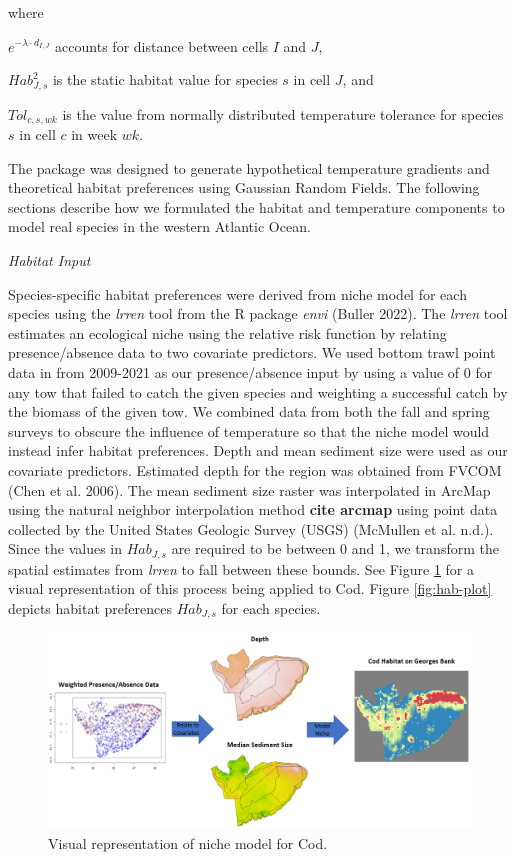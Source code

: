 \documentclass[
  12pt,
]{article}
\begin{document}
where

\(e^{-\lambda \cdot d_{I,J}}\) accounts for distance between cells \(I\) and \(J\),

\(Hab^2_{J,s}\) is the static habitat value for species \(s\) in cell \(J\), and

\(Tol_{c,s,wk}\) is the value from normally distributed temperature tolerance for species \(s\) in cell \(c\) in week \(wk\).

The package was designed to generate hypothetical temperature gradients and theoretical habitat preferences using Gaussian Random Fields. The following sections describe how we formulated the habitat and temperature components to model real species in the western Atlantic Ocean.

\emph{Habitat Input}

Species-specific habitat preferences were derived from niche model for each species using the \emph{lrren} tool from the R package \emph{envi} (Buller 2022). The \emph{lrren} tool estimates an ecological niche using the relative risk function by relating presence/absence data to two covariate predictors. We used bottom trawl point data in from 2009-2021 as our presence/absence input by using a value of 0 for any tow that failed to catch the given species and weighting a successful catch by the biomass of the given tow. We combined data from both the fall and spring surveys to obscure the influence of temperature so that the niche model would instead infer habitat preferences. Depth and mean sediment size were used as our covariate predictors. Estimated depth for the region was obtained from FVCOM (Chen et al. 2006). The mean sediment size raster was interpolated in ArcMap using the natural neighbor interpolation method \textbf{cite arcmap} using point data collected by the United States Geologic Survey (USGS) (McMullen et al. n.d.). Since the values in \(Hab_{J,s}\) are required to be between 0 and 1, we transform the spatial estimates from \emph{lrren} to fall between these bounds. See Figure \ref{fig:hab-plot1} for a visual representation of this process being applied to Cod. Figure \ref{fig:hab-plot} depicts habitat preferences \(Hab_{J,s}\) for each species.

\begin{figure}

{\centering \includegraphics[width=0.95\linewidth]{Images/hab_snip3} 

}

\caption{Visual representation of niche model for Cod.}\label{fig:hab-plot1}
\end{figure}
\end{document}
